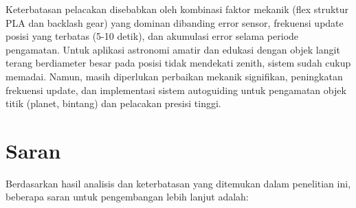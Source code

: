 Keterbatasan pelacakan disebabkan oleh kombinasi faktor mekanik (flex struktur PLA dan backlash gear) yang dominan dibanding error sensor, frekuensi update posisi yang terbatas (5-10 detik), dan akumulasi error selama periode pengamatan. Untuk aplikasi astronomi amatir dan edukasi dengan objek langit terang berdiameter besar pada posisi tidak mendekati zenith, sistem sudah cukup memadai. Namun, masih diperlukan perbaikan mekanik signifikan, peningkatan frekuensi update, dan implementasi sistem autoguiding untuk pengamatan objek titik (planet, bintang) dan pelacakan presisi tinggi. \par

\section{Saran} \label{V.Saran}
Berdasarkan hasil analisis dan keterbatasan yang ditemukan dalam penelitian ini, beberapa saran untuk pengembangan lebih lanjut adalah: \par

